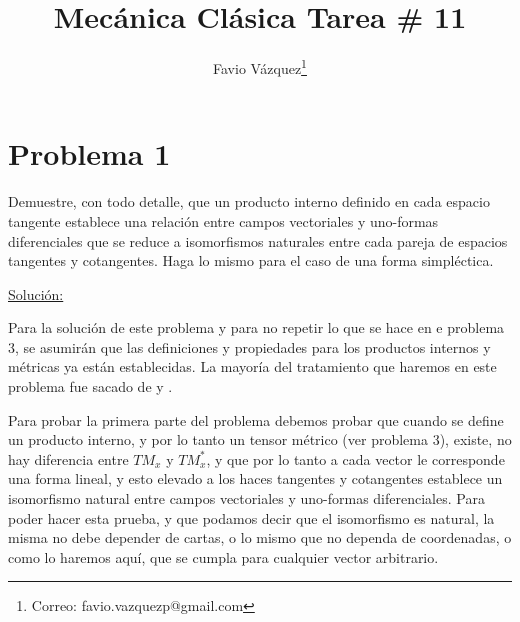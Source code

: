 \documentclass[a4paper,10pt]{article}
\title{Mecánica Clásica Tarea \# 11}
\author{Favio Vázquez\thanks{Correo: favio.vazquezp@gmail.com}}\affil{Instituto de Ciencias Nucleares. Universidad Nacional Autónoma de México.}
\date{}
\numberwithin{equation}{section}
\begin{document}
\makeatletter
\def\@maketitle{%
  \newpage
  \null
  \vskip 2em%
  \begin{center}%
  \let \footnote \thanks
    {\Large\bfseries \@title \par}%
    \vskip 1.5em%
    {\normalsize
      \lineskip .5em%
      \begin{tabular}[t]{c}%
        \@author
      \end{tabular}\par}%
    \vskip 1em%
    {\normalsize \@date}%
  \end{center}%
  \par
  \vskip 1.5em}
\makeatother

\maketitle

\section{Problema 1}

Demuestre, con todo detalle, que un producto interno definido en cada espacio tangente 
establece una relación entre campos vectoriales y uno-formas diferenciales que se reduce 
a isomorfismos naturales entre cada pareja de espacios tangentes y cotangentes. Haga lo 
mismo para el caso de una forma simpléctica. 

\vspace{.3cm}

\underline{Solución:} \vspace{.3cm}

Para la solución de este problema y para no repetir lo que se hace en e
problema 3, se asumirán que las definiciones y propiedades para los productos 
internos y métricas ya están establecidas. La mayoría del tratamiento 
que haremos en este problema fue sacado de \cite{rasband} y \cite{spivak}.

\vspace{.3cm}

Para probar la primera parte del problema debemos probar que cuando 
se define un producto interno, y por lo tanto un tensor métrico (ver problema 3), 
existe, no hay diferencia entre $TM_x$ y $TM_x^*$, y que por lo tanto 
a cada vector le corresponde una forma lineal, y esto elevado a los haces 
tangentes y cotangentes establece un isomorfismo natural entre campos vectoriales 
y uno-formas diferenciales. Para poder hacer esta prueba, y que podamos decir 
que el isomorfismo es natural, la misma no debe depender de cartas, o lo mismo 
que no dependa de coordenadas, o como lo haremos aquí, que se cumpla para 
cualquier vector arbitrario.
\end{document}
